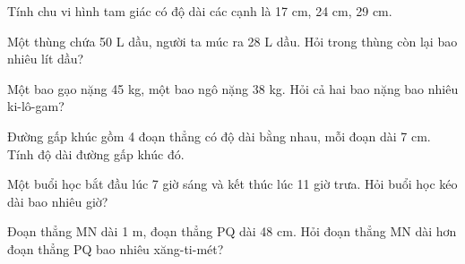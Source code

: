 \begin{ex} %
Tính chu vi hình tam giác có độ dài các cạnh là 17 cm, 24 cm, 29 cm.
\end{ex}

\begin{ex} %
Một thùng chứa 50 L dầu, người ta múc ra 28 L dầu. Hỏi trong thùng còn lại bao nhiêu lít dầu?
\end{ex}

\begin{ex} %
Một bao gạo nặng 45 kg, một bao ngô nặng 38 kg. Hỏi cả hai bao nặng bao nhiêu ki-lô-gam?
\end{ex}

\begin{ex} %
Đường gấp khúc gồm 4 đoạn thẳng có độ dài bằng nhau, mỗi đoạn dài 7 cm. Tính độ dài đường gấp khúc đó.
\end{ex}

\begin{ex} %
Một buổi học bắt đầu lúc 7 giờ sáng và kết thúc lúc 11 giờ trưa. Hỏi buổi học kéo dài bao nhiêu giờ?
\end{ex}

\begin{ex} %
Đoạn thẳng MN dài 1 m, đoạn thẳng PQ dài 48 cm. Hỏi đoạn thẳng MN dài hơn đoạn thẳng PQ bao nhiêu xăng-ti-mét?
\end{ex}
